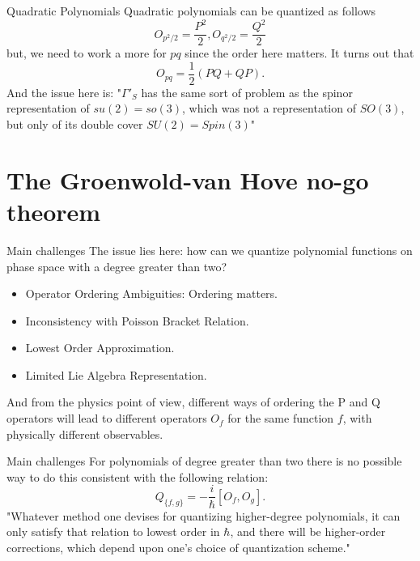\documentclass[12pt]{beamer}
\begin{document}
\begin{frame}{Quadratic Polynomials}
Quadratic polynomials can be quantized as follows
\begin{displaymath}
  O_{p^2/2} = \frac{P^2}{2}, O_{q^2/2} = \frac{Q^2}{2}
\end{displaymath}	
but, we need to work a more for $pq$ since the order here matters. It turns out that
\begin{displaymath}
  O_{pq} = \frac{1}{2}\left( PQ + QP\right).
\end{displaymath}
And the issue here is: "$\Gamma'_{S}$ has the same sort of problem as the spinor representation of $su(2) = so(3)$, which was not a representation of $SO(3)$, but only of its double cover $SU (2) = Spin(3)$"
\end{frame}


\section{The Groenwold-van Hove no-go theorem}
\begin{frame}{Main challenges}
	The issue lies here: how can we quantize polynomial functions on phase space with a degree greater than two?
\begin{itemize}
	\item Operator Ordering Ambiguities: Ordering matters.
	\item Inconsistency with Poisson Bracket Relation.
	\item Lowest Order Approximation.
	\item Limited Lie Algebra Representation.
\end{itemize}
And from the physics point of view, different ways of ordering the P and Q operators will lead to different operators $O_{f}$ for the same function $f$, with physically different observables.
\end{frame}

\begin{frame}{Main challenges}
For polynomials of degree greater than two there is no possible way to do this consistent with the following relation:
\begin{displaymath}
  Q_{\{f,g\}} = -\frac{i}{\hbar}\left[ O_f,O_g \right].
\end{displaymath}
"Whatever method one devises for quantizing higher-degree polynomials, it can only satisfy that relation to lowest order in $\hbar$, and there will be higher-order corrections, which depend upon one's choice of quantization scheme."
\end{frame}
\end{document}
